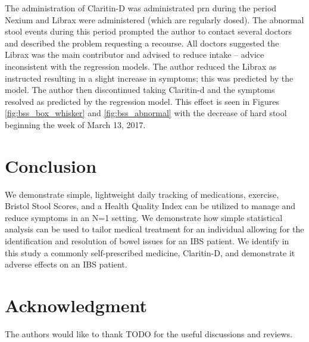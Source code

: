 \documentclass[conference]{IEEEtran}
\begin{document}
The administration of Claritin-D was administrated prn during the period Nexium and Librax were administered (which are regularly dosed).  The abnormal stool events during this period prompted the author to contact several doctors and described the problem requesting a recourse.  All doctors suggested the Librax was the main contributor and advised to reduce intake -- advice inconsistent with the regression models.  The author reduced the Librax as instructed resulting in a slight increase in symptoms; this was predicted by the model. The author then discontinued taking Claritin-d and the symptoms resolved as predicted by the regression model. This effect is seen in Figures \ref{fig:bss_box_whisker} and \ref{fig:bss_abnormal} with the decrease of hard stool beginning the week of March 13, 2017.

\section*{Conclusion}
We demonstrate simple, lightweight daily tracking of medications, exercise, Bristol Stool Scores, and a Health Quality Index can be utilized to manage and reduce symptoms in an N=1 setting.  We demonstrate how simple statistical analysis can be used to tailor medical treatment for an individual allowing for the identification and resolution of bowel issues for an IBS patient.  We identify in this study a commonly self-prescribed medicine, Claritin-D, and demonstrate it adverse effects on an IBS patient.

\section*{Acknowledgment}
The authors would like to thank TODO for the useful discussions and reviews.






%
%
%




\end{document}
